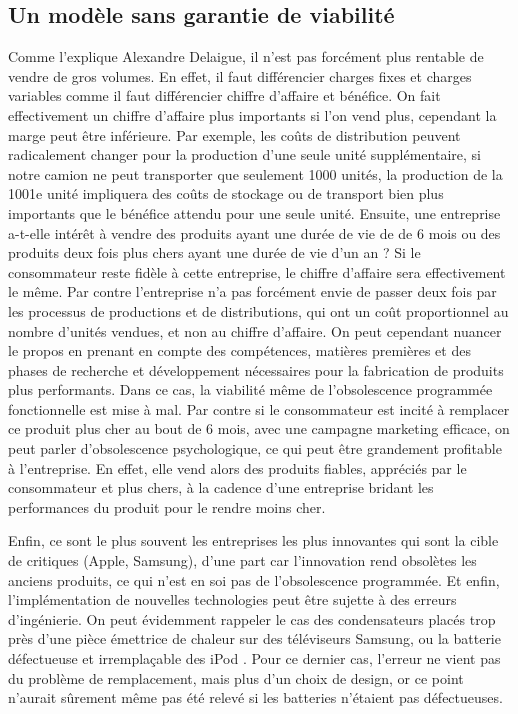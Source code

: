 \subsection{Un modèle sans garantie de viabilité}


Comme l’explique Alexandre Delaigue, il n’est pas forcément plus rentable de vendre de gros volumes.
En effet, il faut différencier charges fixes et charges variables comme il faut différencier chiffre d’affaire et bénéfice. On fait effectivement un chiffre d’affaire plus importants si l’on vend plus, cependant la marge peut être inférieure. Par exemple, les coûts de distribution peuvent radicalement changer pour la production d’une seule unité supplémentaire, si notre camion ne peut transporter que seulement  1000 unités,  la production de la 1001e unité impliquera des coûts de stockage ou de transport bien plus importants que le bénéfice attendu pour une seule unité.
\medbreak
Ensuite, une entreprise a-t-elle intérêt à vendre des produits ayant une durée de vie de de 6 mois ou des produits deux fois plus chers ayant une durée de vie d’un an ? Si le consommateur reste fidèle à cette entreprise, le chiffre d’affaire sera effectivement le même. Par contre l’entreprise n’a pas forcément envie de passer deux fois par les processus de productions et de distributions, qui ont un coût proportionnel au nombre d’unités vendues, et non au chiffre d’affaire. On peut cependant nuancer le propos en prenant en compte des compétences, matières premières  et des phases de recherche et développement nécessaires pour la fabrication de produits plus performants. Dans ce cas, la viabilité même de l’obsolescence programmée fonctionnelle est mise à mal.
\medbreak
Par contre si le consommateur est incité à remplacer ce produit plus cher au bout de 6 mois, avec une campagne marketing efficace, on peut parler d’obsolescence psychologique, ce qui peut être grandement  profitable à l’entreprise. En effet, elle vend alors des produits fiables, appréciés par le consommateur et plus chers, à la cadence d’une entreprise bridant les performances du produit pour le rendre moins cher.

\bigbreak
Enfin, ce sont le plus souvent les entreprises les plus innovantes qui sont la cible de critiques (Apple, Samsung), d’une part car l’innovation rend obsolètes les anciens produits, ce qui n’est en soi pas de l’obsolescence programmée. Et enfin, l’implémentation de nouvelles technologies peut être sujette à des erreurs d’ingénierie. On peut évidemment rappeler le cas des condensateurs placés trop près d’une pièce émettrice de chaleur sur des téléviseurs Samsung, ou la batterie défectueuse et irremplaçable des iPod . Pour ce dernier cas, l’erreur ne vient pas du problème de remplacement, mais plus d'un choix de design, or ce point n’aurait sûrement même pas été relevé si les batteries n’étaient pas défectueuses.

\newpage
